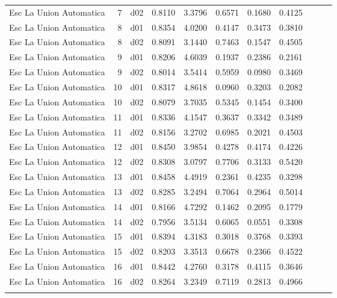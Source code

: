 \begin{landscape}
\begin{longtable}{p{2cm}rrrrrrrrrr}
  Esc La Union Automatica &          7 &     d02 &   0.8110 &  3.3796 &        0.6571 &           0.1680 &  0.4125 \\
  Esc La Union Automatica &          8 &     d01 &   0.8354 &  4.0200 &        0.4147 &           0.3473 &  0.3810 \\
  Esc La Union Automatica &          8 &     d02 &   0.8091 &  3.1440 &        0.7463 &           0.1547 &  0.4505 \\
  Esc La Union Automatica &          9 &     d01 &   0.8206 &  4.6039 &        0.1937 &           0.2386 &  0.2161 \\
  Esc La Union Automatica &          9 &     d02 &   0.8014 &  3.5414 &        0.5959 &           0.0980 &  0.3469 \\
  Esc La Union Automatica &         10 &     d01 &   0.8317 &  4.8618 &        0.0960 &           0.3203 &  0.2082 \\
  Esc La Union Automatica &         10 &     d02 &   0.8079 &  3.7035 &        0.5345 &           0.1454 &  0.3400 \\
  Esc La Union Automatica &         11 &     d01 &   0.8336 &  4.1547 &        0.3637 &           0.3342 &  0.3489 \\
  Esc La Union Automatica &         11 &     d02 &   0.8156 &  3.2702 &        0.6985 &           0.2021 &  0.4503 \\
  Esc La Union Automatica &         12 &     d01 &   0.8450 &  3.9854 &        0.4278 &           0.4174 &  0.4226 \\
  Esc La Union Automatica &         12 &     d02 &   0.8308 &  3.0797 &        0.7706 &           0.3133 &  0.5420 \\
  Esc La Union Automatica &         13 &     d01 &   0.8458 &  4.4919 &        0.2361 &           0.4235 &  0.3298 \\
  Esc La Union Automatica &         13 &     d02 &   0.8285 &  3.2494 &        0.7064 &           0.2964 &  0.5014 \\
  Esc La Union Automatica &         14 &     d01 &   0.8166 &  4.7292 &        0.1462 &           0.2095 &  0.1779 \\
  Esc La Union Automatica &         14 &     d02 &   0.7956 &  3.5134 &        0.6065 &           0.0551 &  0.3308 \\
  Esc La Union Automatica &         15 &     d01 &   0.8394 &  4.3183 &        0.3018 &           0.3768 &  0.3393 \\
  Esc La Union Automatica &         15 &     d02 &   0.8203 &  3.3513 &        0.6678 &           0.2366 &  0.4522 \\
  Esc La Union Automatica &         16 &     d01 &   0.8442 &  4.2760 &        0.3178 &           0.4115 &  0.3646 \\
  Esc La Union Automatica &         16 &     d02 &   0.8264 &  3.2349 &        0.7119 &           0.2813 &  0.4966 \\


\label{tab:estaciones_tiempo_wrf}

\end{longtable}

\end{landscape}